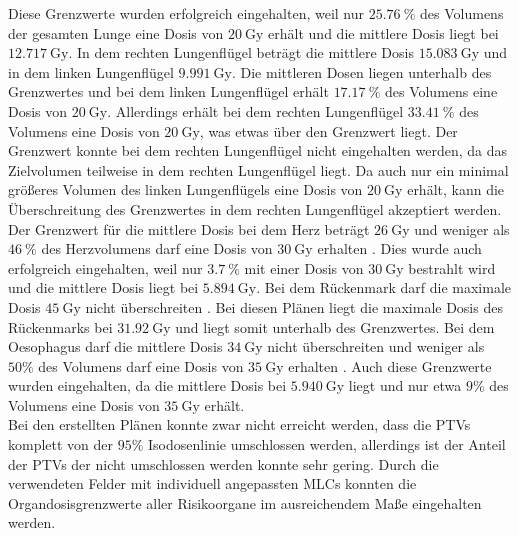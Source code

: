 Diese Grenzwerte wurden erfolgreich eingehalten, weil nur $\SI{25.76}{\percent}$ des Volumens der gesamten Lunge eine Dosis von $\SI{20}{\gray}$
erhält und die mittlere Dosis liegt bei $\SI{12.717}{\gray}$. In dem rechten Lungenflügel beträgt die mittlere Dosis $\SI{15.083}{\gray}$
und in dem linken Lungenflügel $\SI{9.991}{\gray}$. Die mittleren Dosen liegen unterhalb des Grenzwertes und bei dem linken Lungenflügel
erhält $\SI{17.17}{\percent}$ des Volumens eine Dosis von $\SI{20}{\gray}$. Allerdings erhält bei dem rechten Lungenflügel $\SI{33.41}{\percent}$
des Volumens eine Dosis von $\SI{20}{\gray}$, was etwas über den Grenzwert liegt. Der Grenzwert konnte bei dem rechten Lungenflügel
nicht eingehalten werden, da das Zielvolumen teilweise in dem rechten Lungenflügel liegt. Da auch nur ein minimal größeres Volumen des linken
Lungenflügels eine Dosis von $\SI{20}{\gray}$ erhält, kann die Überschreitung des Grenzwertes in dem rechten Lungenflügel akzeptiert werden.
Der Grenzwert für die mittlere Dosis bei dem Herz beträgt $\SI{26}{\gray}$ und weniger als $\SI{46}{\percent}$ des Herzvolumens darf
eine Dosis von $\SI{30}{\gray}$ erhalten \cite{grenz}. Dies wurde auch erfolgreich eingehalten, weil nur $\SI{3.7}{\percent}$ mit einer Dosis von
$\SI{30}{\gray}$ bestrahlt wird und die mittlere Dosis liegt bei $\SI{5.894}{\gray}$.
Bei dem Rückenmark darf die maximale Dosis $\SI{45}{\gray}$ nicht überschreiten \cite{grenz}.
Bei diesen Plänen liegt die maximale Dosis des Rückenmarks bei $\SI{31.92}{\gray}$ und liegt somit unterhalb des Grenzwertes.
Bei dem Oesophagus darf die mittlere Dosis $\SI{34}{\gray}$ nicht überschreiten und weniger als $50\%$ des Volumens darf eine Dosis von $\SI{35}{\gray}$
erhalten \cite{QUANTEC}. Auch diese Grenzwerte wurden eingehalten, da die mittlere Dosis bei $\SI{5.940}{\gray}$ liegt und nur etwa $9\%$ des Volumens eine
Dosis von $\SI{35}{\gray}$ erhält. \\

Bei den erstellten Plänen konnte zwar nicht erreicht werden, dass die PTVs komplett von der $95\%$ Isodosenlinie
umschlossen werden, allerdings ist der Anteil der PTVs der nicht umschlossen werden konnte sehr gering.
Durch die verwendeten Felder mit individuell angepassten MLCs konnten die Organdosisgrenzwerte aller Risikoorgane im ausreichendem Maße eingehalten werden.

